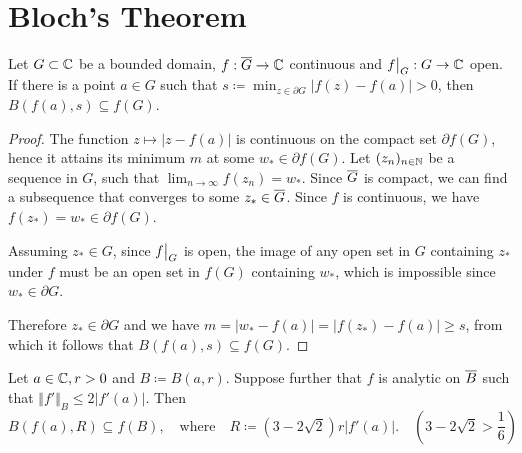 \section{Bloch's Theorem}
\label{sec:blochs-theorem}

\begin{lemma} \label{lem:bloch-lemma-1}
    Let $G \subset \mathbb{C}$ be a bounded domain, $f : \overline{G} \to \mathbb{C}$ continuous and $\restr{f}{G} : G \to \C$ open. If there is a point $a \in G$ such that $s \coloneqq \min_{z \in \partial G} \vert f(z) - f(a) \vert > 0$, then $B(f(a), s) \subseteq f(G)$.
\end{lemma}

\begin{proof}
    The function $z \mapsto \vert z - f(a) \vert$ is continuous on the compact set $\partial f(G)$, hence it attains its minimum $m$ at some $w_* \in \partial f(G)$. Let $(z_n)_{n \in \mathbb{N}}$ be a sequence in $G$, such that $\lim_{n \to \infty} f(z_n) = w_*$. Since $\overline{G}$ is compact, we can find a subsequence that converges to some $z_* \in \overline{G}$. Since $f$ is continuous, we have $f(z_*) = w_* \in \partial f(G)$.

    Assuming $z_* \in G$, since $\restr{f}{G}$ is open, the image of any open set in $G$ containing $z_*$ under $f$ must be an open set in $f(G)$ containing $w_*$, which is impossible since $w_* \in \partial G$.

    Therefore $z_* \in \partial G$ and we have $m = \vert w_* - f(a) \vert = \vert f(z_*) - f(a) \vert \geq s$, from which it follows that $B(f(a), s) \subseteq f(G)$.
\end{proof}

\begin{lemma} \label{lem:bloch-lemma-2}
    Let $a \in \mathbb{C}, r > 0$ and $B \coloneqq B(a, r)$. Suppose further that $f$ is analytic on $\overline{B}$ such that $\Vert f' \Vert_B \leq 2 \vert f'(a) \vert$. Then
    $$ B(f(a), R) \subseteq f(B), \quad \textrm{where} \quad R \coloneqq (3 - 2 \sqrt{2}) r \vert f'(a) \vert. \quad (3 - 2 \sqrt{2} > {\textstyle\frac{1}{6}}) $$
\end{lemma}

